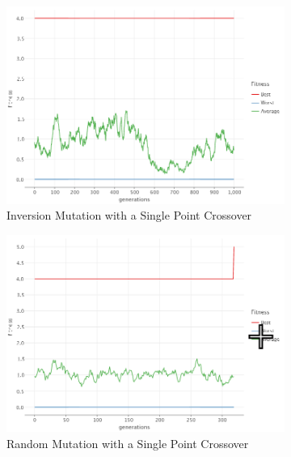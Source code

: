     \begin{figure}[ht!]
        \centering
        \begin{subfigure}{0.35\textwidth}
            \includegraphics[width=\textwidth]{img/beacon_sp_inv_1.png}
            \caption{Inversion Mutation with a Single Point Crossover}
            \label{fig:beacon:1:inversion}
        \end{subfigure}
        \hfill
        \begin{subfigure}{0.35\textwidth}
            \includegraphics[width=\textwidth]{img/beacon_sp_random_1.png}
            \caption{Random Mutation with a Single Point Crossover}
            \label{fig:beacon:1:random}
        \end{subfigure}
        \begin{subfigure}{0.35\textwidth}

\end{subfigure}
\end{figure}
